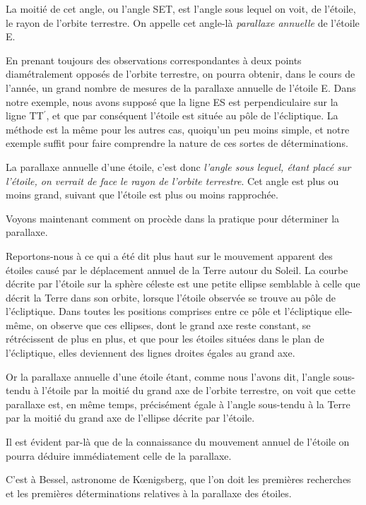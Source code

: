 \documentclass[a4paper, 11pt, oneside]{article}
\begin{document}
La moitié de cet angle, ou l'angle SET, est l'angle sous lequel on voit, de l'étoile, le rayon de l'orbite terrestre. On appelle cet angle-là \emph{parallaxe annuelle} de l'étoile E.

En prenant toujours des observations correspondantes à deux points diamétralement opposés de l'orbite terrestre, on pourra obtenir, dans le cours de l'année, un grand nombre de mesures de la parallaxe annuelle de l'étoile E. Dans notre exemple, nous avons supposé que la ligne ES est perpendiculaire sur la ligne TT$^{\prime}$, et que par conséquent l'étoile est située au pôle de l'écliptique. La méthode est la même pour les autres cas, quoiqu'un peu moins simple, et notre exemple suffit pour faire comprendre la nature de ces sortes de déterminations.

La parallaxe annuelle d'une étoile, c'est donc \emph{l'angle sous lequel, étant placé sur l'étoile, on verrait de face le rayon de l'orbite terrestre}. Cet angle est plus ou moins grand, suivant que l'étoile est plus ou moins rapprochée.

Voyons maintenant comment on procède dans la pratique pour déterminer la parallaxe.

Reportons-nous à ce qui a été dit plus haut sur le mouvement apparent des étoiles causé par le déplacement annuel de la Terre autour du Soleil. La courbe décrite par l'étoile sur la sphère céleste est une petite ellipse semblable à celle que décrit la Terre dans son orbite, lorsque l'étoile observée se trouve au pôle de l'écliptique. Dans toutes les positions comprises entre ce pôle et l'écliptique elle-même, on observe que ces ellipses, dont le grand axe reste constant, se rétrécissent de plus en plus, et que pour les étoiles situées dans le plan de l'écliptique, elles deviennent des lignes droites égales au grand axe.

Or la parallaxe annuelle d'une étoile étant, comme nous l'avons dit, l'angle sous-tendu à l'étoile par la moitié du grand axe de l'orbite terrestre, on voit que cette parallaxe est, en même temps, précisément égale à l'angle sous-tendu à la Terre par la moitié du grand axe de l'ellipse décrite par l'étoile.

Il est évident par-là que de la connaissance du mouvement annuel de l'étoile on pourra déduire immédiatement celle de la parallaxe.

C'est à Bessel, astronome de Kœnigsberg, que l'on doit les premières recherches et les premières déterminations relatives à la parallaxe des étoiles.
\end{document}
